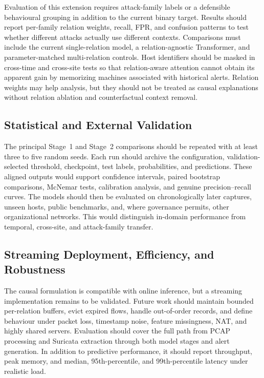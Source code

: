 \documentclass[11pt,fleqn]{report}
\begin{document}
Evaluation of this extension requires attack-family labels or a defensible
behavioural grouping in addition to the current binary target. Results should
report per-family relation weights, recall, FPR, and confusion patterns to test
whether different attacks actually use different contexts. Comparisons must
include the current single-relation model, a relation-agnostic Transformer, and
parameter-matched multi-relation controls. Host identifiers should be masked in
cross-time and cross-site tests so that relation-aware attention cannot obtain
its apparent gain by memorizing machines associated with historical alerts.
Relation weights may help analysis, but they should not be treated as causal
explanations without relation ablation and counterfactual context removal.

\subsection{Statistical and External Validation}
\label{subsubsec:future_validation}

The principal Stage~1 and Stage~2 comparisons should be repeated with at least
three to five random seeds. Each run should archive the configuration,
validation-selected threshold, checkpoint, test labels, probabilities, and
predictions. These aligned outputs would support confidence intervals, paired
bootstrap comparisons, McNemar tests, calibration analysis, and genuine
precision--recall curves. The models should then be evaluated on
chronologically later captures, unseen hosts, public benchmarks, and, where
governance permits, other organizational networks. This would distinguish
in-domain performance from temporal, cross-site, and attack-family transfer.

\subsection{Streaming Deployment, Efficiency, and Robustness}
\label{subsubsec:future_streaming_deployment}

The causal formulation is compatible with online inference, but a streaming
implementation remains to be validated. Future work should maintain bounded
per-relation buffers, evict expired flows, handle out-of-order records, and
define behaviour under packet loss, timestamp noise, feature missingness, NAT,
and highly shared servers. Evaluation should cover the full path from PCAP
processing and Suricata extraction through both model stages and alert
generation. In addition to predictive performance, it should report throughput,
peak memory, and median, 95th-percentile, and 99th-percentile latency under
realistic load.
\end{document}
